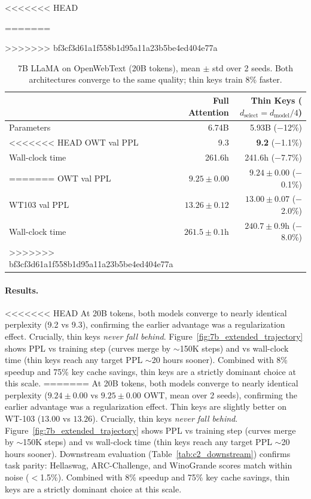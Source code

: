 \documentclass{article} %
\newcommand{\dmodel}{d_{\text{model}}}
\newcommand{\dselect}{d_{\text{select}}}
\begin{document}
\begin{table}[h]
\centering
<<<<<<< HEAD
\caption{7B LLaMA on OpenWebText (20B tokens). Both architectures converge to the same quality; thin keys train 8\% faster.}
=======
\caption{7B LLaMA on OpenWebText (20B tokens), mean $\pm$ std over 2 seeds. Both architectures converge to the same quality; thin keys train 8\% faster.}
>>>>>>> bf3cf3d61a1f558b1d95a11a23b5be4ed404e77a
\label{tab:7b_extended}
\begin{tabular}{lrr}
\toprule
 & Full Attention & Thin Keys ($\dselect = \dmodel/4$) \\
\midrule
Parameters & 6.74B & 5.93B ($-$12\%) \\
<<<<<<< HEAD
OWT val PPL & 9.3 & \textbf{9.2} ($-$1.1\%) \\
Wall-clock time & 261.6h & 241.6h ($-$7.7\%) \\
=======
OWT val PPL & $9.25 \pm 0.00$ & $\mathbf{9.24 \pm 0.00}$ ($-$0.1\%) \\
WT103 val PPL & $13.26 \pm 0.12$ & $\mathbf{13.00 \pm 0.07}$ ($-$2.0\%) \\
Wall-clock time & $261.5 \pm 0.1$h & $240.7 \pm 0.9$h ($-$8.0\%) \\
>>>>>>> bf3cf3d61a1f558b1d95a11a23b5be4ed404e77a
\bottomrule
\end{tabular}
\end{table}

\paragraph{Results.}
<<<<<<< HEAD
At 20B tokens, both models converge to nearly identical perplexity (9.2 vs 9.3), confirming the earlier advantage was a regularization effect. Crucially, thin keys \emph{never fall behind}. Figure~\ref{fig:7b_extended_trajectory} shows PPL vs training step (curves merge by $\sim$150K steps) and vs wall-clock time (thin keys reach any target PPL $\sim$20 hours sooner). Combined with 8\% speedup and 75\% key cache savings, thin keys are a strictly dominant choice at this scale.
=======
At 20B tokens, both models converge to nearly identical perplexity ($9.24 \pm 0.00$ vs $9.25 \pm 0.00$ OWT, mean over 2 seeds), confirming the earlier advantage was a regularization effect. Thin keys are slightly better on WT-103 ($13.00$ vs $13.26$). Crucially, thin keys \emph{never fall behind}. Figure~\ref{fig:7b_extended_trajectory} shows PPL vs training step (curves merge by $\sim$150K steps) and vs wall-clock time (thin keys reach any target PPL $\sim$20 hours sooner). Downstream evaluation (Table~\ref{tab:c2_downstream}) confirms task parity: Hellaswag, ARC-Challenge, and WinoGrande scores match within noise ($<$1.5\%). Combined with 8\% speedup and 75\% key cache savings, thin keys are a strictly dominant choice at this scale.
\end{document}

